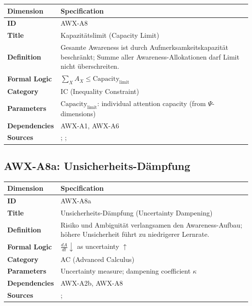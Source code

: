 \begin{table}[htbp]
\small
\begin{tabular}{p{3cm}p{11cm}}
\toprule
\textbf{Dimension} & \textbf{Specification} \\
\midrule
\textbf{ID} & AWX-A8 \\
\textbf{Title} & Kapazitätslimit (Capacity Limit) \\
\textbf{Definition} & Gesamte Awareness ist durch Aufmerksamkeitskapazität beschränkt; Summe aller Awareness-Allokationen darf Limit nicht überschreiten. \\
\textbf{Formal Logic} & $\sum_X A_X \leq \text{Capacity}_{\text{limit}}$ \\
\textbf{Category} & IC (Inequality Constraint) \\
\textbf{Parameters} & $\text{Capacity}_{\text{limit}}$: individual attention capacity (from $\Psi$-dimensions) \\
\textbf{Dependencies} & AWX-A1, AWX-A6 \\
\textbf{Sources} & \citet{simon1955behavioral}; \citet{kahneman2003maps}; \citet{sims2003implications} \\
\bottomrule
\end{tabular}
\end{table}


\subsection{AWX-A8a: Unsicherheits-Dämpfung}

\begin{table}[htbp]
\small
\begin{tabular}{p{3cm}p{11cm}}
\toprule
\textbf{Dimension} & \textbf{Specification} \\
\midrule
\textbf{ID} & AWX-A8a \\
\textbf{Title} & Unsicherheits-Dämpfung (Uncertainty Dampening) \\
\textbf{Definition} & Risiko und Ambiguität verlangsamen den Awareness-Aufbau; höhere Unsicherheit führt zu niedrigerer Lernrate. \\
\textbf{Formal Logic} & $\frac{dA}{dt} \downarrow$ as uncertainty $\uparrow$ \\
\textbf{Category} & AC (Advanced Calculus) \\
\textbf{Parameters} & Uncertainty measure; dampening coefficient $\kappa$ \\
\textbf{Dependencies} & AWX-A2b, AWX-A8 \\
\textbf{Sources} & \citet{ellsberg1961risk}; \citet{camerer1992recent} \\
\bottomrule
\end{tabular}
\end{table}

